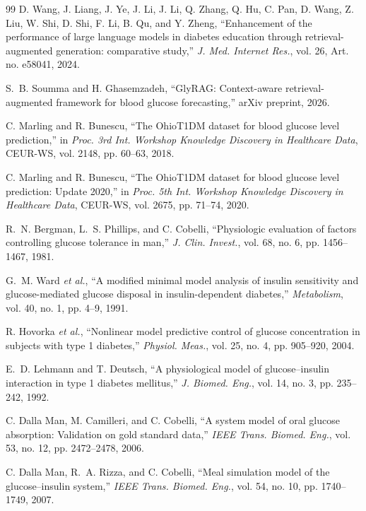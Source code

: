 \documentclass[journal]{IEEEtran}
\begin{document}
\begin{thebibliography}{99}
\label{ref28label} D. Wang, J. Liang, J. Ye, J. Li, J. Li, Q. Zhang, Q. Hu, C. Pan, D. Wang, Z. Liu, W. Shi, D. Shi, F. Li, B. Qu, and Y. Zheng, ``Enhancement of the performance of large language models in diabetes education through retrieval-augmented generation: comparative study,'' \emph{J. Med. Internet Res.}, vol. 26, Art. no. e58041, 2024.

\label{ref29label} S.~B. Soumma and H. Ghasemzadeh, ``GlyRAG: Context-aware retrieval-augmented framework for blood glucose forecasting,'' arXiv preprint, 2026.

\label{ref30label} C. Marling and R. Bunescu, ``The OhioT1DM dataset for blood glucose level prediction,'' in \emph{Proc. 3rd Int. Workshop Knowledge Discovery in Healthcare Data}, CEUR-WS, vol. 2148, pp. 60--63, 2018.

\label{ref31label} C. Marling and R. Bunescu, ``The OhioT1DM dataset for blood glucose level prediction: Update 2020,'' in \emph{Proc. 5th Int. Workshop Knowledge Discovery in Healthcare Data}, CEUR-WS, vol. 2675, pp. 71--74, 2020.

\label{ref32label} R.~N. Bergman, L.~S. Phillips, and C. Cobelli, ``Physiologic evaluation of factors controlling glucose tolerance in man,'' \emph{J. Clin. Invest.}, vol. 68, no. 6, pp. 1456--1467, 1981.

\label{ref33label} G.~M. Ward \emph{et al.}, ``A modified minimal model analysis of insulin sensitivity and glucose-mediated glucose disposal in insulin-dependent diabetes,'' \emph{Metabolism}, vol. 40, no. 1, pp. 4--9, 1991.

\label{ref34label} R. Hovorka \emph{et al.}, ``Nonlinear model predictive control of glucose concentration in subjects with type 1 diabetes,'' \emph{Physiol. Meas.}, vol. 25, no. 4, pp. 905--920, 2004.

\label{ref35label}E.~D. Lehmann and T. Deutsch, ``A physiological model of glucose--insulin interaction in type 1 diabetes mellitus,'' \emph{J. Biomed. Eng.}, vol. 14, no. 3, pp. 235--242, 1992.

\label{ref36label} C. Dalla Man, M. Camilleri, and C. Cobelli, ``A system model of oral glucose absorption: Validation on gold standard data,'' \emph{IEEE Trans. Biomed. Eng.}, vol. 53, no. 12, pp. 2472--2478, 2006.

\label{ref37label} C. Dalla Man, R.~A. Rizza, and C. Cobelli, ``Meal simulation model of the glucose--insulin system,'' \emph{IEEE Trans. Biomed. Eng.}, vol. 54, no. 10, pp. 1740--1749, 2007.


\end{thebibliography}
\end{document}
